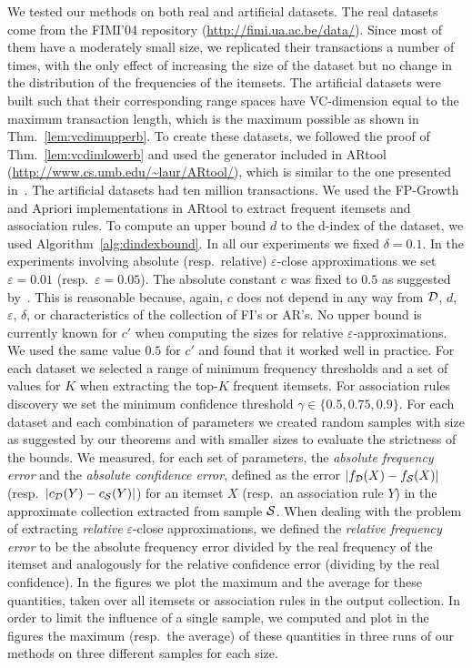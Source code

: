 We tested our methods on both real and artificial datasets. The real datasets
come from the FIMI'04 repository (\url{http://fimi.ua.ac.be/data/}). Since most
of them have a moderately small size, we replicated their transactions a number
of times, with the only effect of increasing the size of the dataset but no
change in the distribution of the frequencies of the itemsets. The artificial
datasets were built such that their corresponding range spaces
have VC-dimension equal to the maximum transaction length, which is the
maximum possible as shown in Thm.~\ref{lem:vcdimupperb}. To create these
datasets, we followed the proof of Thm.~\ref{lem:vcdimlowerb} and used the
generator included in ARtool (\url{http://www.cs.umb.edu/~laur/ARtool/}), which
is similar to the one presented in~\citep{AgrawalS94}. The artificial datasets
had ten million transactions. We used the FP-Growth and
Apriori implementations in ARtool to extract frequent itemsets and association
rules. To compute an upper bound $d$ to the d-index of the dataset, we used
Algorithm~\ref{alg:dindexbound}.
In all our experiments we fixed $\delta=0.1$. In the experiments involving
absolute (resp.~relative) $\varepsilon$-close approximations we set
$\varepsilon=0.01$ (resp.~$\varepsilon=0.05$). The absolute constant $c$ was fixed to
$0.5$ as suggested by~\citep{LofflerP09}. This is reasonable because, again, $c$
does not depend in any way from ${\cal D}$, $d$, $\varepsilon$, $\delta$, or
characteristics of the collection of FI's or AR's. No upper bound is currently
known for $c'$ when computing the sizes for relative
$\varepsilon$-approximations. We used the same value $0.5$ for $c'$ and
found that it worked well in practice. For each dataset we selected a
range of minimum frequency thresholds and a set of values for $K$ when
extracting the top-$K$ frequent itemsets. For association rules discovery we set
the minimum confidence threshold $\gamma\in\{0.5, 0.75, 0.9\}$. For each
dataset and each combination of parameters we created random samples with size
as suggested by our theorems and with smaller sizes to evaluate the strictness
of the bounds.  
We measured, for each set of parameters, the \emph{absolute
frequency error} and the \emph{absolute confidence error}, defined 
as  the error
$|f_{\cal D}(X)-f_{\cal S}(X)|$ (resp.~$|c_{\cal D}(Y)-c_{\cal S}(Y)|$) for an itemset $X$
(resp.~an association rule $Y$) in the approximate collection extracted from sample ${\cal S}$.
When dealing with the
problem of extracting \emph{relative} $\varepsilon$-close approximations, we
defined the \emph{relative frequency error} to be the absolute
frequency error divided by the real frequency of the itemset and analogously for
the relative confidence error (dividing by the real confidence). In the figures
we plot the maximum and the average for these quantities, taken over all
itemsets or association rules in the output collection. In order to limit the
influence of a single sample, we computed and plot in the figures the maximum
(resp.~the average) of these quantities in three runs of our methods on three
different samples for each size.

